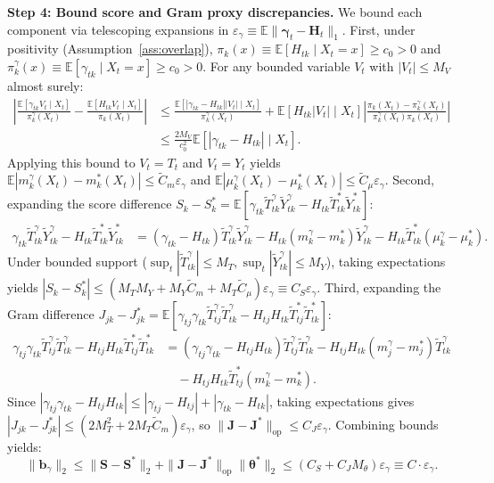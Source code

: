\documentclass[twoside]{article}
\theoremstyle{definition}
\newcommand{\E}{\mathbb{E}}
\begin{document}
\textbf{Step 4: Bound score and Gram proxy discrepancies.}
We bound each component via telescoping expansions in $\varepsilon_\gamma \equiv \E\|\boldsymbol{\gamma}_t - \boldsymbol{H}_t\|_1$.
First, under positivity (Assumption~\ref{ass:overlap}), $\pi_k(x) \equiv \E[H_{tk} \mid X_t=x] \ge c_0 > 0$ and $\pi_k^\gamma(x) \equiv \E[\gamma_{tk} \mid X_t=x] \ge c_0 > 0$. For any bounded variable $V_t$ with $|V_t| \le M_V$ almost surely:
\begin{align}
    \left| \frac{\E[\gamma_{tk} V_t \mid X_t]}{\pi_k^\gamma(X_t)} - \frac{\E[H_{tk} V_t \mid X_t]}{\pi_k(X_t)} \right| 
    &\le \frac{\E[|\gamma_{tk} - H_{tk}| |V_t| \mid X_t]}{\pi_k^\gamma(X_t)} + \E[H_{tk}|V_t| \mid X_t] \left| \frac{\pi_k(X_t) - \pi_k^\gamma(X_t)}{\pi_k^\gamma(X_t) \pi_k(X_t)} \right| \nonumber \\
    &\le \frac{2 M_V}{c_0^2} \E[|\gamma_{tk} - H_{tk}| \mid X_t].
\end{align}
Applying this bound to $V_t = T_t$ and $V_t = Y_t$ yields $\E|m_k^\gamma(X_t) - m_k^*(X_t)| \le \tilde{C}_m \varepsilon_\gamma$ and $\E|\mu_k^\gamma(X_t) - \mu_k^*(X_t)| \le \tilde{C}_\mu \varepsilon_\gamma$.
Second, expanding the score difference $S_k - S_k^* = \E[\gamma_{tk} \tilde{T}_{tk}^\gamma \tilde{Y}_{tk}^\gamma - H_{tk} \tilde{T}_{tk}^* \tilde{Y}_{tk}^*]$:
\begin{align}
    \gamma_{tk} \tilde{T}_{tk}^\gamma \tilde{Y}_{tk}^\gamma - H_{tk} \tilde{T}_{tk}^* \tilde{Y}_{tk}^* &= (\gamma_{tk} - H_{tk}) \tilde{T}_{tk}^\gamma \tilde{Y}_{tk}^\gamma - H_{tk} (m_k^\gamma - m_k^*) \tilde{Y}_{tk}^\gamma - H_{tk} \tilde{T}_{tk}^* (\mu_k^\gamma - \mu_k^*).
\end{align}
Under bounded support ($\sup_t |\tilde{T}_{tk}^\gamma| \le M_T, \sup_t |\tilde{Y}_{tk}^\gamma| \le M_Y$), taking expectations yields $|S_k - S_k^*| \le (M_T M_Y + M_Y \tilde{C}_m + M_T \tilde{C}_\mu) \varepsilon_\gamma \equiv C_S \varepsilon_\gamma$.
Third, expanding the Gram difference $J_{jk} - J_{jk}^* = \E[\gamma_{tj}\gamma_{tk} \tilde{T}_{tj}^\gamma \tilde{T}_{tk}^\gamma - H_{tj}H_{tk} \tilde{T}_{tj}^* \tilde{T}_{tk}^*]$:
\begin{align}
    \gamma_{tj}\gamma_{tk} \tilde{T}_{tj}^\gamma \tilde{T}_{tk}^\gamma - H_{tj}H_{tk} \tilde{T}_{tj}^* \tilde{T}_{tk}^* &= (\gamma_{tj}\gamma_{tk} - H_{tj}H_{tk}) \tilde{T}_{tj}^\gamma \tilde{T}_{tk}^\gamma - H_{tj}H_{tk} (m_j^\gamma - m_j^*) \tilde{T}_{tk}^\gamma \nonumber \\
    &\quad - H_{tj}H_{tk} \tilde{T}_{tj}^* (m_k^\gamma - m_k^*).
\end{align}
Since $|\gamma_{tj}\gamma_{tk} - H_{tj}H_{tk}| \le |\gamma_{tj} - H_{tj}| + |\gamma_{tk} - H_{tk}|$, taking expectations gives $|J_{jk} - J_{jk}^*| \le (2 M_T^2 + 2 M_T \tilde{C}_m) \varepsilon_\gamma$, so $\|\boldsymbol{J} - \boldsymbol{J}^*\|_{\mathrm{op}} \le C_J \varepsilon_\gamma$.
Combining bounds yields:
\begin{equation}
    \|\boldsymbol{b}_\gamma\|_2 \le \|\boldsymbol{S} - \boldsymbol{S}^*\|_2 + \|\boldsymbol{J} - \boldsymbol{J}^*\|_{\mathrm{op}} \|\boldsymbol{\theta}^*\|_2 \le (C_S + C_J M_\theta) \varepsilon_\gamma \equiv C \cdot \varepsilon_\gamma.
\end{equation}
\end{document}
